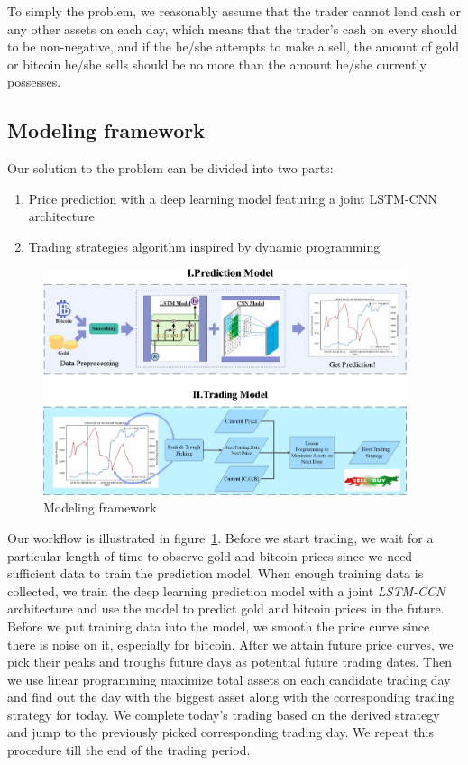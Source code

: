 \documentclass{mcmthesis}
\begin{document}
To simply the problem, we reasonably assume that the trader cannot lend cash or any other assets on each day, which means that the trader's cash on every should to be non-negative, and if the he/she attempts to make a sell, the amount of gold or bitcoin he/she sells should be no more than the amount he/she currently possesses.


\subsection{Modeling framework}
Our solution to the problem can be divided into two parts:
\begin{enumerate}
    \item Price prediction with a deep learning model featuring a joint LSTM-CNN architecture
    \item Trading strategies algorithm inspired by dynamic programming
\end{enumerate}

\begin{figure}[htb]
    \centering
    \includegraphics[width = 0.95\textwidth]{fig/model framework.png}  %
    \caption{Modeling framework}
    \label{fig:framework}
\end{figure}

Our workflow is illustrated in figure~\ref{fig:framework}. Before we start trading, we wait for a particular length of time to observe gold and bitcoin prices since we need sufficient data to train the prediction model. When enough training data is collected, we train the deep learning prediction model with a joint \emph{LSTM-CCN} architecture and use the model to predict gold and bitcoin prices in the future. Before we put training data into the model, we smooth the price curve since there is noise on it, especially for bitcoin. After we attain future price curves, we pick their peaks and troughs future days as potential future trading dates. Then we use linear programming maximize total assets on each candidate trading day and find out the day with the biggest asset along with the corresponding trading strategy for today. We complete today's trading based on the derived strategy and jump to the previously picked corresponding trading day. We repeat this procedure till the end of the trading period.
\end{document}

